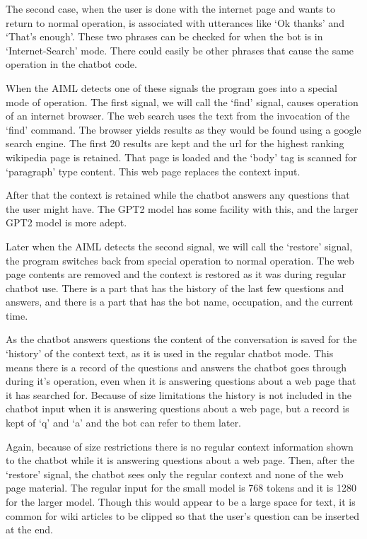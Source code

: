 The second case, when the user is done with the internet page and wants to return to normal operation, is associated with utterances like `Ok thanks' and `That's enough'. These two phrases can be checked for when the bot is in `Internet-Search' mode. There could easily be other phrases that cause the same operation in the chatbot code.

When the AIML detects one of these signals the program goes into a special mode of operation. The first signal, we will call the `find' signal, causes operation of an internet browser. The web search uses the text from the invocation of the `find' command. The browser yields results as they would be found using a google search engine. The first 20 results are kept and the url for the highest ranking wikipedia page is retained. That page is loaded and the `body' tag is scanned for `paragraph' type content. This web page replaces the context input. 

After that the context is retained while the chatbot answers any questions that the user might have. The GPT2 model has some facility with this, and the larger GPT2 model is more adept.

Later when the AIML detects the second signal, we will call the `restore' signal, the program switches back from special operation to normal operation. The web page contents are removed and the context is restored as it was during regular chatbot use. There is a part that has the history of the last few questions and answers, and there is a part that has the bot name, occupation, and the current time.

As the chatbot answers questions the content of the conversation is saved for the `history' of the context text, as it is used in the regular chatbot mode. This means there is a record of the questions and answers the chatbot goes through during it's operation, even when it is answering questions about a web page that it has searched for. Because of size limitations the history is not included in the chatbot input when it is answering questions about a web page, but a record is kept of `q' and `a' and the bot can refer to them later.

Again, because of size restrictions there is no regular context information shown to the chatbot while it is answering questions about a web page. Then, after the `restore' signal, the chatbot sees only the regular context and none of the web page material. The regular input for the small model is 768 tokens and it is 1280 for the larger model. Though this would appear to be a large space for text, it is common for wiki articles to be clipped so that the user's question can be inserted at the end.

